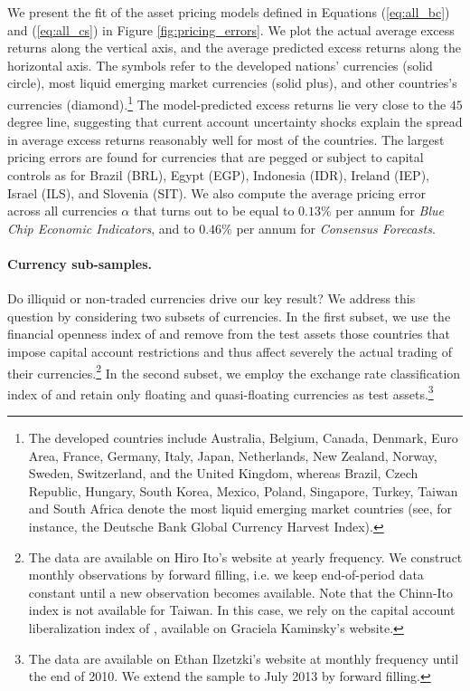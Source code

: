 We present the fit of the asset pricing models defined in Equations (\ref{eq:all_bc}) and (\ref{eq:all_cs}) in Figure \ref{fig:pricing_errors}.  We plot the actual average excess returns along the vertical axis, and the average predicted excess returns along the horizontal axis.  The symbols refer to the developed nations' currencies (solid circle), most liquid emerging market currencies (solid plus), and other countries's currencies (diamond).\footnote{The developed countries include Australia, Belgium, Canada, Denmark, Euro Area, France, Germany, Italy, Japan, Netherlands, New Zealand, Norway, Sweden, Switzerland, and the United Kingdom, whereas Brazil, Czech Republic, Hungary, South Korea, Mexico, Poland, Singapore, Turkey, Taiwan and South Africa denote the most liquid emerging market countries (see, for instance, the Deutsche Bank Global Currency Harvest Index).} The model-predicted excess returns lie very close to the $45$ degree line, suggesting that current account uncertainty shocks explain the spread in average excess returns reasonably well for most of the countries. The largest pricing errors are found for currencies that are pegged or subject to capital controls as for Brazil (BRL), Egypt (EGP), Indonesia (IDR), Ireland (IEP), Israel (ILS), and Slovenia (SIT). We also compute the average pricing error across all currencies $\alpha$ that turns out to be equal to $0.13\%$ per annum for \emph{Blue Chip Economic Indicators}, and to $0.46\%$ per annum for \emph{Consensus Forecasts}.

\paragraph{Currency sub-samples.}
Do illiquid or non-traded currencies drive our key result?  We address this question by considering two subsets of currencies. In the first subset, we use the financial openness index of \citet{chinn_ito/06} and remove from the test assets those countries that impose capital account restrictions and thus affect severely the actual trading of their currencies.\footnote{The data are available on Hiro Ito's website at yearly frequency. We construct monthly observations by forward filling, i.e. we keep end-of-period data constant until a new observation becomes available. Note that the Chinn-Ito index is not available for Taiwan. In this case, we rely on the capital account liberalization index of \citet{KS/2008}, available on Graciela Kaminsky's website.} In the second subset, we employ the exchange rate classification index of \citet{IRR/2011} and retain only floating and quasi-floating currencies as test assets.\footnote{The data are available on Ethan Ilzetzki's website at monthly frequency until the end of 2010. We extend the sample to July 2013 by forward filling.}

